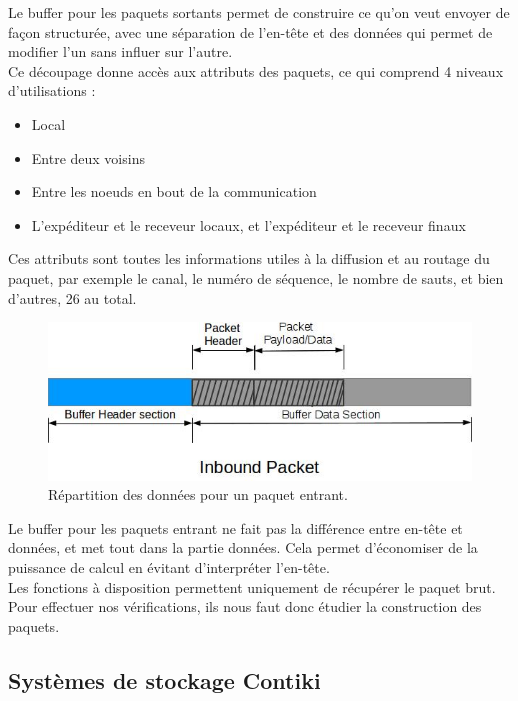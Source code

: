 			
			Le buffer pour les paquets sortants permet de construire ce qu'on veut envoyer de façon structurée, avec une séparation de l'en-tête et des données qui permet de modifier l'un sans influer sur l'autre. \\
			Ce découpage donne accès aux attributs des paquets, ce qui comprend 4 niveaux d'utilisations :
			\begin{itemize}
				\item Local
				\item Entre deux voisins
				\item Entre les noeuds en bout de la communication
				\item L'expéditeur et le receveur locaux, et l'expéditeur et le receveur finaux
			\end{itemize}
			Ces attributs sont toutes les informations utiles à la diffusion et au routage du paquet, par exemple le canal, le numéro de séquence, le nombre de sauts, et bien d'autres, 26 au total.
			
			\clearpage
			
			\begin{figure}[htp]
				\centering
				\includegraphics[width=13cm]{images/In.jpg}
				\caption{Répartition des données pour un paquet entrant.}
				\label{fig:inbuf}
			\end{figure}
			
			Le buffer pour les paquets entrant ne fait pas la différence entre en-tête et données, et met tout dans la partie données. Cela permet d'économiser de la puissance de calcul en évitant d'interpréter l'en-tête.\\
			Les fonctions à disposition permettent uniquement de récupérer le paquet brut. Pour effectuer nos vérifications, ils nous faut donc étudier la construction des paquets.
	
	\subsection{Systèmes de stockage Contiki}
		
